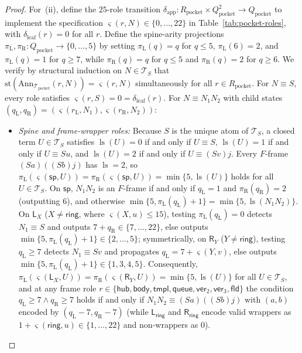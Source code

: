 \documentclass[11pt,reqno]{amsart}
\numberwithin{equation}{section}
\theoremstyle{plain}
\theoremstyle{definition}
\theoremstyle{remark}
\DeclareMathOperator{\ls}{ls}
\newcommand{\TS}{\mathcal{T}_S}
\begin{document}
\begin{proof}
For~(ii), define the $25$-role transition $\delta_{\mathrm{app}} \colon R_{\mathrm{pocket}} \times Q_{\mathrm{pocket}}^2 \to Q_{\mathrm{pocket}}$ to implement the specification $\varsigma(r, N) \in \{0,\dots,22\}$ in Table~\ref{tab:pocket-roles}, with $\delta_{\mathrm{leaf}}(r) = 0$ for all $r$. Define the spine-arity projections $\pi_{\mathrm{L}}, \pi_{\mathrm{R}} \colon Q_{\mathrm{pocket}} \to \{0,\dots,5\}$ by setting $\pi_{\mathrm{L}}(q) = q$ for $q \le 5$, $\pi_{\mathrm{L}}(6) = 2$, and $\pi_{\mathrm{L}}(q) = 1$ for $q \ge 7$, while $\pi_{\mathrm{R}}(q) = q$ for $q \le 5$ and $\pi_{\mathrm{R}}(q) = 2$ for $q \ge 6$. We verify by structural induction on $N \in \TS$ that $\mathrm{st}(\mathrm{Ann}_{\mathcal{T}_{\mathrm{pocket}}}(r, N)) = \varsigma(r, N)$ simultaneously for all $r \in R_{\mathrm{pocket}}$. For $N \equiv S$, every role satisfies $\varsigma(r, S) = 0 = \delta_{\mathrm{leaf}}(r)$. For $N \equiv N_1 N_2$ with child states $(q_{\mathrm{L}}, q_{\mathrm{R}}) = (\varsigma(r_{\mathrm{L}}, N_1), \varsigma(r_{\mathrm{R}}, N_2))$:
\begin{itemize}[leftmargin=2.0em]
  \item \emph{Spine and frame-wrapper roles:} Because $S$ is the unique atom of $\TS$, a closed term $U \in \TS$ satisfies $\ls(U) = 0$ if and only if $U \equiv S$, $\ls(U) = 1$ if and only if $U \equiv S u$, and $\ls(U) = 2$ if and only if $U \equiv (S v) j$. Every $F$-frame $(S a)((S b) j)$ has $\ls = 2$, so $\pi_{\mathrm{L}}(\varsigma(\mathsf{sp}, U)) = \pi_{\mathrm{R}}(\varsigma(\mathsf{sp}, U)) = \min\{5, \ls(U)\}$ holds for all $U \in \TS$. On $\mathsf{sp}$, $N_1 N_2$ is an $F$-frame if and only if $q_{\mathrm{L}} = 1$ and $\pi_{\mathrm{R}}(q_{\mathrm{R}}) = 2$ (outputting $6$), and otherwise $\min\{5, \pi_{\mathrm{L}}(q_{\mathrm{L}}) + 1\} = \min\{5, \ls(N_1 N_2)\}$. On $\mathsf{L}_X$ ($X \ne \mathsf{ring}$, where $\varsigma(X, u) \le 15$), testing $\pi_{\mathrm{L}}(q_{\mathrm{L}}) = 0$ detects $N_1 \equiv S$ and outputs $7 + q_{\mathrm{R}} \in \{7,\dots,22\}$, else outputs $\min\{5, \pi_{\mathrm{L}}(q_{\mathrm{L}}) + 1\} \in \{2,\dots,5\}$; symmetrically, on $\mathsf{R}_Y$ ($Y \ne \mathsf{ring}$), testing $q_{\mathrm{L}} \ge 7$ detects $N_1 \equiv S v$ and propagates $q_{\mathrm{L}} = 7 + \varsigma(Y, v)$, else outputs $\min\{5, \pi_{\mathrm{L}}(q_{\mathrm{L}}) + 1\} \in \{1,3,4,5\}$. Consequently, $\pi_{\mathrm{L}}(\varsigma(\mathsf{L}_X, U)) = \pi_{\mathrm{R}}(\varsigma(\mathsf{R}_Y, U)) = \min\{5, \ls(U)\}$ for all $U \in \TS$, and at any frame role $r \in \{\mathsf{hub}, \mathsf{body}, \mathsf{tmpl}, \mathsf{queue}, \mathsf{ver}_2, \mathsf{ver}_3, \mathsf{fld}\}$ the condition $q_{\mathrm{L}} \ge 7 \land q_{\mathrm{R}} \ge 7$ holds if and only if $N_1 N_2 \equiv (S a)((S b) j)$ with $(a, b)$ encoded by $(q_{\mathrm{L}} - 7, q_{\mathrm{R}} - 7)$ (while $\mathsf{L}_{\mathsf{ring}}$ and $\mathsf{R}_{\mathsf{ring}}$ encode valid wrappers as $1 + \varsigma(\mathsf{ring}, u) \in \{1,\dots,22\}$ and non-wrappers as $0$).

\end{itemize}
\end{proof}
\end{document}
